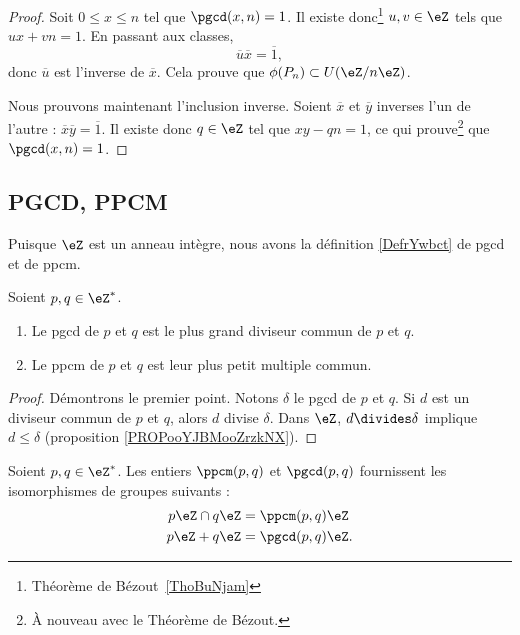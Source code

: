 \begin{proof}
	Soit \( 0\leq x\leq n\) tel que \( \pgcd(x,n)=1\). Il existe donc\footnote{Théorème de Bézout~\ref{ThoBuNjam}} \( u,v\in\eZ\) tels que \( ux+vn=1\). En passant aux classes,
	\begin{equation}
		\overline u\overline x=\overline 1,
	\end{equation}
	donc \( \overline u\) est l'inverse de \( \overline x\). Cela prouve que \( \phi(P_n)\subset U(\eZ/n\eZ)\).

	Nous prouvons maintenant l'inclusion inverse. Soient \( \overline x\) et \( \overline y\) inverses l'un de l'autre : \( \overline x\overline y=\overline 1\). Il existe donc \( q\in\eZ\) tel que \( xy-qn=1\), ce qui prouve\footnote{À nouveau avec le Théorème de Bézout.} que \( \pgcd(x,n)=1\).
\end{proof}



\subsection{PGCD, PPCM}

Puisque \( \eZ\) est un anneau intègre, nous avons la définition \ref{DefrYwbct} de pgcd et de ppcm.
\begin{proposition}       \label{PROPooAVRGooUfhjwF}
	Soient \( p,q\in\eZ^*\).
	\begin{enumerate}
		\item
		      Le pgcd de \( p\) et \( q\) est le plus grand diviseur commun de \( p\) et \( q\).
		\item
		      Le ppcm de \( p\) et \( q\) est leur plus petit multiple commun.
	\end{enumerate}
\end{proposition}

\begin{proof}
	Démontrons le premier point. Notons \( \delta\) le pgcd de \( p\) et \( q\). Si \( d\) est un diviseur commun de \( p\) et \( q\), alors \( d\) divise \( \delta\). Dans \( \eZ\), \( d\divides \delta\) implique \( d\leq\delta\) (proposition \ref{PROPooYJBMooZrzkNX}).
\end{proof}

\begin{lemma}
	Soient \( p,q\in\eZ^*\). Les entiers \( \ppcm(p,q)\) et \( \pgcd(p,q)\) fournissent les isomorphismes de groupes suivants :
	\begin{subequations}
		\begin{align}
			p\eZ\cap q\eZ & =\ppcm(p,q)\eZ  \\
			p\eZ + q\eZ   & =\pgcd(p,q)\eZ.
		\end{align}
	\end{subequations}
\end{lemma}

